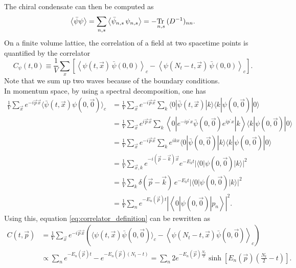 The chiral condensate can then be computed as
\begin{equation*}
    \left\langle  \bar\psi \psi \right\rangle = \underset{n,s}\sum  \left\langle \bar\psi_{n,s} \, \psi_{n,s} \right\rangle = -\underset{n,s}{\operatorname{\text{Tr} \,}} \, (D^{-1})_{nn}.
\end{equation*}
On a finite volume lattice, the correlation of a field at two spacetime points is quantified by the correlator
\begin{equation}
    C_\psi(t,0) \equiv \frac{1}{V} \sum_{x} \left[\left\langle \psi(t, \vec{x}) \, \bar\psi(0,0)\right\rangle_c - \left\langle \psi(N_t-t, \vec{x}) \, \bar\psi(0,0)\right\rangle_c \right] .
    \label{eq:correlator_definition}
\end{equation}
Note that we sum up two waves because of the boundary conditions. \\
In momentum space, by using a spectral decomposition, one has
\begin{equation*}
    \begin{aligned}
        \frac{1}{V} \sum_{\vec{x}} e^{-i \vec{p} \vec{x}}\langle\bar\psi(t, \vec{x}) \psi(0, \vec{0})\rangle_c & =\frac{1}{V} \sum_{\vec{x}} e^{-i \vec{p} \vec{x}} \sum_k\langle 0|\bar\psi(t, \vec{x})| k\rangle\langle k|\psi(0, \vec{0})| 0\rangle \\
        & =\frac{1}{V} \sum_{\vec{x}} e^{i \vec{p} \vec{x}} \sum_k\left\langle 0\left|e^{-i p^{\prime} x} \bar\psi(0, \vec{0}) e^{i p^{\prime} x}\right| k\right\rangle\langle k|\psi(0, \vec{0})| 0\rangle \\
        & =\frac{1}{V} \sum_{\vec{x}} e^{-i \vec{p} \vec{x}} \sum_k e^{i k x}\langle 0|\bar\psi(0, \vec{0})| k\rangle\langle k|\psi(0, \vec{0})| 0\rangle \\
        & =\frac{1}{V} \sum_{\vec{x}, k} e^{-i(\vec{p}-\vec{k}) \vec{x}} e^{-E_k t}|\langle 0|\psi(0, \vec{0})| k\rangle|^2 \\
        & =\frac{1}{V} \sum_k \delta(\vec{p}-\vec{k}) \, e^{-E_k t} |\langle 0|\psi(0, \vec{0})| k\rangle|^2 \\
        & =\frac{1}{V} \sum_n e^{-E_n(\vec{p}) t}\left|\left\langle 0|\psi(0, \vec{0})| p_n\right\rangle\right|^2.
        \end{aligned}
\end{equation*}
Using this, equation \eqref{eq:correlator_definition} can be rewritten as
\begin{equation*} 
    \begin{aligned}
        C(t, \vec{p}) & =\frac{1}{V} \sum_{\vec{x}} e^{-i \vec{p} \vec{x}}\left(\langle\psi(t, \vec{x}) \bar{\psi}(0, \vec{0})\rangle_c-\left\langle\psi\left(N_t-t, \vec{x}\right) \bar{\psi}(0, \vec{0})\right\rangle_c\right) \\
        & \propto \sum_n e^{-E_n(\vec{p}) t}-e^{-E_n(\vec{p})\left(N_t-t\right)}=\sum_n 2 e^{-E_n(\vec{p}) \frac{N_t}{2}} \sinh \left[E_n(\vec{p})\left(\frac{N_t}{2}-t\right)\right] .
    \end{aligned}
\end{equation*}

